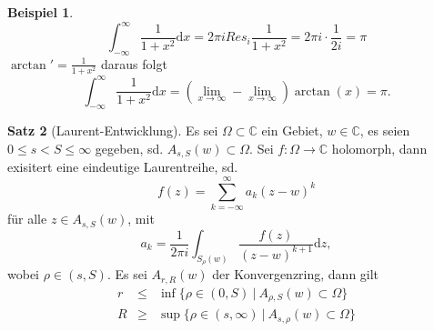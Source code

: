 \documentclass[11pt,titlepage]{article}
\theoremstyle{definition}
\newtheorem{theorem}{Satz}[section]
\newtheorem{example}[theorem]{Beispiel}
\theoremstyle{remark}
\begin{document}
	\begin{example}
		\[ \int_{-\infty}^{\infty} \frac{1}{1+x^2}\mathrm{d}x=2\pi i Res_i \frac{1}{1+x^2} = 
		2\pi i\cdot \frac{1}{2i}=\pi \]
		$\arctan'=\frac{1}{1+x^2}$ daraus folgt
		\[ \int_{-\infty}^{\infty} \frac{1}{1+x^2}\mathrm{d}x =\left(\lim_{x\to\infty}-\lim_{x\to\infty}\right)
		\arctan(x) =\pi. \]
	\end{example}
	
	\begin{theorem}[Laurent-Entwicklung]
		Es sei $\Omega\subset\mathbb{C}$ ein Gebiet, $w\in\mathbb{C}$, es seien $0\leq s<S\leq \infty$ 
		gegeben, sd. $A_{s,S}(w)\subset\Omega$. Sei $f:\Omega\to\mathbb{C}$ holomorph, dann 
		exisitert eine eindeutige Laurentreihe, sd.
		\[ f(z)=\sum_{k=-\infty}^{\infty} a_k (z-w)^k \]
		für alle $z\in A_{s,S}(w)$, mit
		\[ a_k=\frac{1}{2\pi i} \int_{S_{\rho}(w)}\frac{f(z)}{(z-w)^{k+1}}\mathrm{d}z, \]
		wobei $\rho\in (s,S)$. Es sei $A_{r,R}(w)$ der Konvergenzring, dann gilt
		\begin{eqnarray*}
			r &\leq& \inf \{\rho\in (0,S)\ \vert\ A_{\rho,S}(w)\subset\Omega\} \\
			R &\geq& \sup\{\rho\in (s,\infty)\ \vert\ A_{s,\rho}(w)\subset\Omega\}
		\end{eqnarray*}
		
		
	\end{theorem}
	
\end{document}
